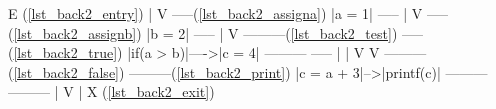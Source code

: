 \begin{minipage}[t]{2in}
\begin{AVerb}
     E (\ref{lst_back2_entry})  \label{lst_back2_entry}
     |
     V
   -----(\ref{lst_back2_assigna})  \label{lst_back2_assigna}
  |a = 1|
   -----
     |
     V
   -----(\ref{lst_back2_assignb})  \label{lst_back2_assignb}
  |b = 2|
   -----
     |   \label{lst_back2_test}
     V   \label{lst_back2_true}
 ---------(\ref{lst_back2_test})    -----(\ref{lst_back2_true})
|if(a > b)|---->|c = 4|
 ---------       -----
     |             |  \label{lst_back2_false}
     V             V  \label{lst_back2_print}
 ---------(\ref{lst_back2_false})  ---------(\ref{lst_back2_print})
|c = a + 3|-->|printf(c)|
 ---------     ---------
                   |  \label{lst_back2_exit}
                   V
                   |
                   X (\ref{lst_back2_exit})
\end{AVerb}
\end{minipage}





